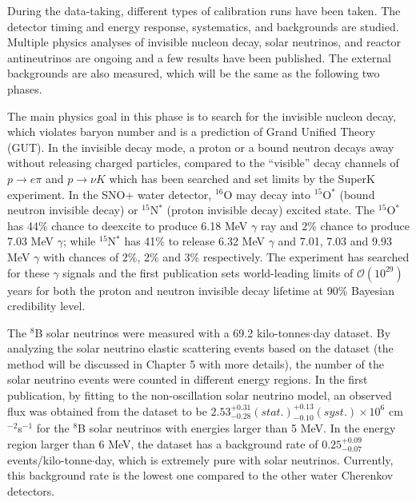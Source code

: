 During the data-taking, different types of calibration runs have been taken. The detector timing and energy response, systematics, and backgrounds are studied. Multiple physics analyses of invisible nucleon decay, solar neutrinos, and reactor antineutrinos are ongoing and a few results have been published\cite{anderson2019search,anderson2019measurement,anderson2020measurement}. The external backgrounds are also measured, which will be the same as the following two phases.

The main physics goal in this phase is to search for the invisible nucleon decay, which violates baryon number and is a prediction of Grand Unified Theory (GUT). In the invisible decay mode, a proton or a bound neutron decays away without releasing charged particles, compared to the ``visible'' decay channels of $p\to e\pi$ and $p\to\nu K$ which has been searched and set limits by the SuperK experiment. In the SNO+ water detector, $^{16}$O may decay into $^{15}$O$^*$ (bound neutron invisible decay) or $ ^{15}$N$^*$ (proton invisible decay) excited state. The $^{15}$O$^*$ has 44\% chance to deexcite to produce 6.18 MeV $\gamma$ ray and 2\% chance to produce 7.03 MeV $\gamma$; while $^{15}$N$^*$ has 41\% to release 6.32 MeV $\gamma$ and 7.01, 7.03 and 9.93 MeV $\gamma$ with chances of 2\%, 2\% and 3\% respectively. The experiment has searched for these $\gamma$ signals and the first publication sets world-leading limits of $\mathcal{O}(10^{29})$ years for both the proton and neutron invisible decay lifetime at 90\% Bayesian credibility level\cite{anderson2019search}. 

The $^8$B solar neutrinos were measured with a 69.2 kilo-tonnes$\cdot$day dataset. By analyzing the solar neutrino elastic scattering events based on the dataset (the method will be discussed in Chapter 5 with more details), the number of the solar neutrino events were counted in different energy regions. In the first publication\cite{anderson2019measurement}, by fitting to the non-oscillation solar neutrino model, an observed flux was obtained from the dataset to be $2.53^{+0.31}_{-0.28}(stat.)^{+0.13}_{-0.10}(syst.)\times 10^6$ cm$^{-2}$s$^{-1}$ for the $^8$B solar neutrinos with energies larger than 5 MeV. In the energy region larger than 6 MeV, the dataset has a background rate of $0.25^{+0.09}_{-0.07}$ events/kilo-tonne$\cdot$day, which is extremely pure with solar neutrinos. Currently, this background rate is the lowest one compared to the other water Cherenkov detectors\cite{anderson2019measurement}. 


